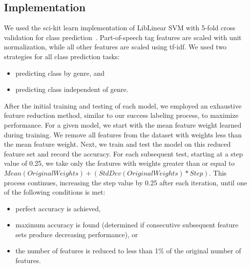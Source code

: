 \subsection*{Implementation}\label{subsec:implementation}
We used the sci-kit learn implementation of LibLinear SVM with 5-fold cross validation for class prediction~\cite{scikit-learn,LIB}.
Part-of-speech tag features are scaled with unit normalization, while all other features are scaled using tf-idf. We used two strategies for all class prediction tasks: 
\begin{itemize}
    \item predicting class by genre, and
    \item predicting class independent of genre.
\end{itemize}

After the initial training and testing of each model, we employed an exhaustive feature reduction method, similar to our success labeling process, to maximize performance.
For a given model, we start with the mean feature weight learned during training.
We remove all features from the dataset with weights less than the mean feature weight.
Next, we train and test the model on this reduced feature set and record the accuracy.
For each subsequent test, starting at a step value of 0.25, we take only the features with weights greater than or equal to $Mean(Original Weights) + (StdDev(Original Weights) * Step)$.
This process continues, increasing the step value by 0.25 after each iteration, until one of the following conditions is met:
\begin{itemize}
    \item perfect accuracy is achieved,
    \item maximum accuracy is found (determined if consecutive subsequent feature sets produce decreasing performance), or 
    \item the number of features is reduced to less than 1\% of the original number of features.
\end{itemize}
